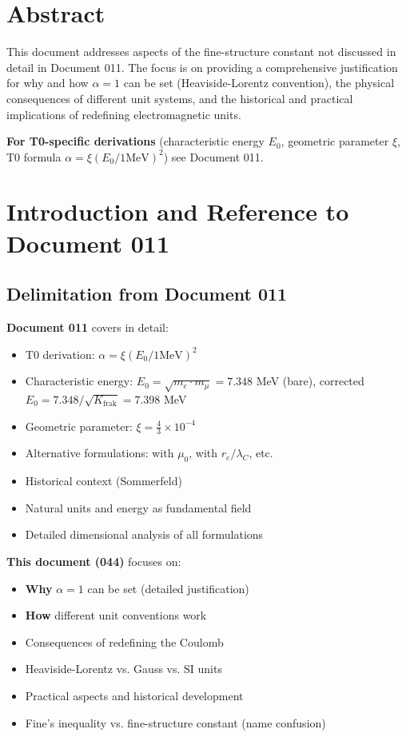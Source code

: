 \section*{Abstract}
		This document addresses aspects of the fine-structure constant not discussed in detail in Document 011. The focus is on providing a comprehensive justification for why and how $\alpha = 1$ can be set (Heaviside-Lorentz convention), the physical consequences of different unit systems, and the historical and practical implications of redefining electromagnetic units.
		
		\textbf{For T0-specific derivations} (characteristic energy $E_0$, geometric parameter $\xi$, T0 formula $\alpha = \xi(E_0/1\text{MeV})^2$) see Document 011.

	
	
	
	\section{Introduction and Reference to Document 011}
	
	\subsection{Delimitation from Document 011}
	
	\textbf{Document 011} covers in detail:
	\begin{itemize}
		\item T0 derivation: $\alpha = \xi(E_0/1\text{MeV})^2$
		\item Characteristic energy: $E_0 = \sqrt{m_e \cdot m_\mu} = 7.348$ MeV (bare), corrected $E_0 = 7.348/\sqrt{K_{\text{frak}}} = 7.398$ MeV
		\item Geometric parameter: $\xi = \frac{4}{3} \times 10^{-4}$
		\item Alternative formulations: with $\mu_0$, with $r_e/\lambda_C$, etc.
		\item Historical context (Sommerfeld)
		\item Natural units and energy as fundamental field
		\item Detailed dimensional analysis of all formulations
	\end{itemize}
	
	\textbf{This document (044)} focuses on:
	\begin{itemize}
		\item \textbf{Why} $\alpha = 1$ can be set (detailed justification)
		\item \textbf{How} different unit conventions work
		\item Consequences of redefining the Coulomb
		\item Heaviside-Lorentz vs. Gauss vs. SI units
		\item Practical aspects and historical development
		\item Fine's inequality vs. fine-structure constant (name confusion)
	\end{itemize}
	
